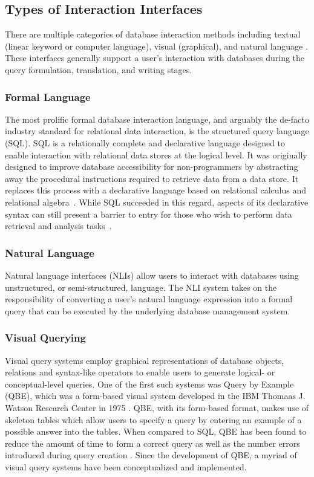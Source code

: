 \subsection{Types of Interaction Interfaces}

There are multiple categories of database interaction methods including textual (linear keyword or computer language), visual (graphical), and natural language \cite{1637793}. These interfaces generally support a user's interaction with databases during the query formulation, translation, and writing stages. 

\subsubsection{Formal Language}

The most prolific formal database interaction language, and arguably the de-facto industry standard for relational data interaction, is the structured query language (SQL). 
SQL is a relationally complete and declarative language designed to enable interaction with relational data stores at the logical level. 
It was originally designed to improve database accessibility for non-programmers by abstracting away the procedural instructions required to retrieve data from a data store. 
It replaces this process with a declarative language based on relational calculus and relational algebra~\cite{Chamberlin1974}. 
While SQL succeeded in this regard, aspects of its declarative syntax can still present a barrier to entry for those who wish to perform data retrieval and analysis tasks~\cite{10.1145/3514214, 10.1145/2729094.2742620}.

\subsubsection{Natural Language}

Natural language interfaces (NLIs) allow users to interact with databases using unstructured, or semi-structured, language. 
The NLI system takes on the responsibility of converting a user's natural language expression into a formal query that can be executed by the underlying database management system.

\subsubsection{Visual Querying}

Visual query systems employ graphical representations of database objects, relations and syntax-like operators to enable users to generate logical- or conceptual-level queries. 
One of the first such systems was Query by Example (QBE), which was a form-based visual system developed in the IBM Thomaas J. Watson Research Center in 1975 \cite{10.1145/1282480.1282482}. 
QBE, with its form-based format, makes use of skeleton tables which allow users to specify a query by entering an example of a possible answer into the tables. 
When compared to SQL, QBE has been found to reduce the amount of time to form a correct query as well as the number errors introduced during query creation \cite{223806}. Since the development of QBE, a myriad of visual query systems have been conceptualized and implemented.


